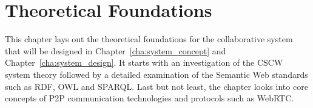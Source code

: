 
\chapter{Theoretical Foundations} %
\label{cha:theoretical_foundations}

This chapter lays out the theoretical foundations for the collaborative system that will be designed in Chapter~\ref{cha:system_concept} and Chapter~\ref{cha:system_design}. It starts with an investigation of the \gls{CSCW} system theory followed by a detailed examination of the Semantic Web standards such as \gls{RDF}, \gls{OWL} and \gls{SPARQL}. Last but not least, the chapter looks into core concepts of \gls{P2P} communication technologies and protocols such as \gls{WebRTC}.








